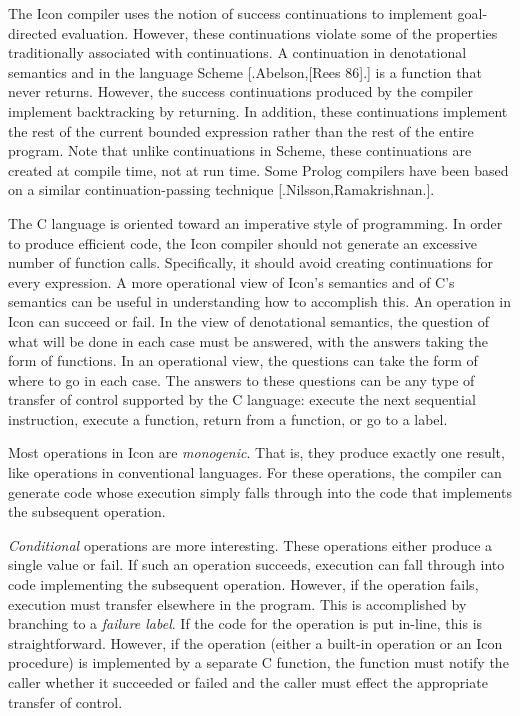 The Icon compiler uses the notion of success continuations to
implement goal-directed evaluation. However, these continuations
violate some of the properties traditionally associated with
continuations. A continuation in denotational semantics and in the
language Scheme [.Abelson,[Rees 86].] is a function that never
returns. However, the success continuations produced by the compiler
implement backtracking by returning. In addition, these continuations
implement the rest of the current bounded expression rather than the
rest of the entire program. Note that unlike continuations in Scheme,
these continuations are created at compile time, not at run time. Some
Prolog compilers have been based on a similar continuation-passing
technique [.Nilsson,Ramakrishnan.].

The C language is oriented toward an imperative style of
programming. In order to produce efficient code, the Icon compiler
should not generate an excessive number of function
calls. Specifically, it should avoid creating continuations for every
expression. A more operational view of Icon's semantics and of C's
semantics can be useful in understanding how to accomplish this. An
operation in Icon can succeed or fail. In the view of denotational
semantics, the question of what will be done in each case must be
answered, with the answers taking the form of functions. In an
operational view, the questions can take the form of where to go in
each case. The answers to these questions can be any type of transfer
of control supported by the C language: execute the next sequential
instruction, execute a function, return from a function, or go to a
label.

Most operations in Icon are \textit{monogenic}. That is, they produce
exactly one result, like operations in conventional languages. For
these operations, the compiler can generate code whose execution
simply falls through into the code that implements the subsequent
operation.

\textit{Conditional} operations are more interesting. These operations
either produce a single value or fail. If such an operation succeeds,
execution can fall through into code implementing the subsequent
operation. However, if the operation fails, execution must transfer
elsewhere in the program. This is accomplished by branching to a
\textit{failure label}. If the code for the operation is put in-line,
this is straightforward. However, if the operation (either a built-in
operation or an Icon procedure) is implemented by a separate C
function, the function must notify the caller whether it succeeded or
failed and the caller must effect the appropriate transfer of control.

